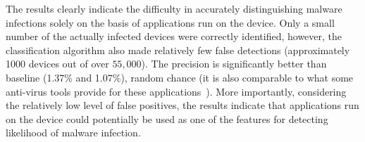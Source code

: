 The results clearly indicate the difficulty in accurately distinguishing malware
infections solely on the basis of applications run
on the device. Only a small number of the actually infected devices were
correctly identified, however, the classification algorithm also made
relatively few false detections (approximately 1000 devices out of
over $55,000$).  The precision is significantly better than
baseline (1.37\% and 1.07\%), random chance (it is also comparable to
what some anti-virus tools provide for these
applications~\cite{zhou_dissecting_2012}). More importantly, considering
the relatively low level of false positives, the results indicate that
applications run on the device could potentially be used as one of the
features for detecting likelihood of malware infection.

\ifwww
{}
\newcommand\rownumber{\stepcounter{magicrownumbers}\arabic{magicrownumbers}}
